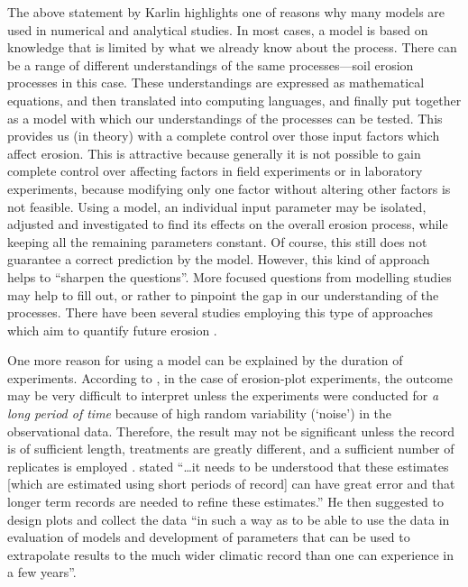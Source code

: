 The above statement by Karlin highlights one of reasons why many models are used
in numerical and analytical studies. In most cases, a model is based on
knowledge that is limited by what we already know about the process. There can
be a range of different understandings of the same processes---soil erosion
processes in this case. These understandings are expressed as mathematical
equations, and then translated into computing languages, and finally put
together as a model with which our understandings of the processes can be
tested. This provides us (in theory) with a complete control over those input
factors which affect erosion. This is attractive because generally it
is not possible to gain complete control over affecting factors in field
experiments or in laboratory experiments, because modifying only
one factor without altering other factors is not feasible. Using a model, an
individual input parameter may be isolated, adjusted and investigated to find
its effects on the overall erosion process, while keeping all the remaining
parameters constant. Of course, this still does not guarantee a correct
prediction by the model. However, this kind of approach helps to ``sharpen the
questions''. More focused questions from modelling studies may help to fill out,
or rather to pinpoint the gap in our understanding of the processes. There have
been several studies employing this type of approaches which aim to
quantify future erosion
\citep{favis-mortlock1995-365,favis-mortlock1999-329,pruski2002-7,
nearing2005-131}.

One more reason for using a model can be explained by the duration of
experiments. According to \citet{web_[Se-list]}, in the case of erosion-plot
experiments, the outcome may be very difficult to interpret unless the
experiments were conducted for \emph{a long period of time} because of high
random variability (`noise') in the observational data. Therefore, the result
may not be significant unless
the record is of sufficient length, treatments are greatly different, and a
sufficient number of replicates is employed \citep{nearing1999-1829}.
\citet{web_[Se-list]} stated ``\ldots it needs to be understood that these
estimates [which are estimated using short periods of record] can have great
error and that longer term records are needed to refine these estimates.'' He
then suggested to design plots and collect the data ``in such a way as to be
able to use the data in evaluation of models and development of parameters that
can be used to extrapolate results to the much wider climatic record than one
can experience in a few years''.

